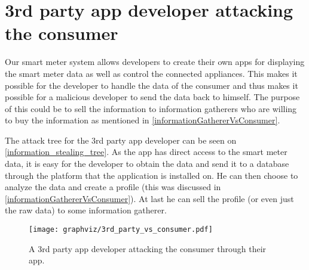 \section{3rd party app developer attacking the consumer}\label{3rdpartyattacktree}
Our smart meter system allows developers to create their own apps for displaying the smart meter data as well as control the connected appliances.
This makes it possible for the developer to handle the data of the consumer and thus makes it possible for a malicious developer to send the data back to himself.
The purpose of this could be to sell the information to information gatherers who are willing to buy the information as mentioned in \cref{informationGathererVsConsumer}.

The attack tree for the 3rd party app developer can be seen on \cref{information_stealing_tree}.
As the app has direct access to the smart meter data, it is easy for the developer to obtain the data and send it to a database through the platform that the application is installed on.
He can then choose to analyze the data and create a profile (this was discussed in \cref{informationGathererVsConsumer}).
At last he can sell the profile (or even just the raw data) to some information gatherer.

\begin{figure}
  \begin{center}
    \texttt{[image: graphviz/3rd\_party\_vs\_consumer.pdf]}
  \end{center}
  \caption{A 3rd party app developer attacking the consumer through their app.}
  \label{3rdpartyTree}
\end{figure}